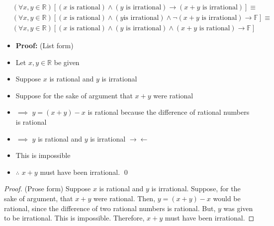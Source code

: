 \begin{Solution}{7.3}
\begin{align*}
&(\forall x,y\in\mathbb{R})[ (x \text{ is rational}) \land (y \text{ is irrational}) \rightarrow (x+y \text{ is irrational}) ]\equiv \\
&(\forall x,y\in\mathbb{R})[ (x \text{ is rational}) \land (y \text {is irrational}) \land \lnot (x+y \text{ is irrational}) \rightarrow \mathbb{F} ]\equiv \\
&(\forall x,y\in\mathbb{R})[ (x \text{ is rational}) \land (y \text{ is irrational}) \land (x+y \text{ is rational}) \rightarrow \mathbb{F} ]
\end{align*}
\begin{itemize}[noitemsep, label=$\blacktriangleright$]
    \item \textbf{Proof:} (List form)
    \item Let $x,y\in\mathbb{R}$ be given
    \item Suppose  $x$ is rational and $y$ is irrational
    \item Suppose for the sake of argument that $x+y$ were rational
    \item $\implies$ $y=(x+y)-x$ is rational because the difference of rational numbers is rational
    \item $\implies$  $y$ is rational and $y$ is irrational $\rightarrow\leftarrow$
    \item This is impossible
    \item $\therefore$ $x+y$ must have been irrational. \qed
\end{itemize}
\begin{proof}(Prose form)
Suppose $x$ is rational and $y$ is irrational. Suppose, for the sake of argument, that $x+y$ were rational.
Then, $y=(x+y)-x$ would be rational, since the difference of two rational numbers is rational. But,
$y$ was given to be irrational. This  is impossible. Therefore, $x+y$ must have been irrational.
\end{proof}
\end{Solution}
